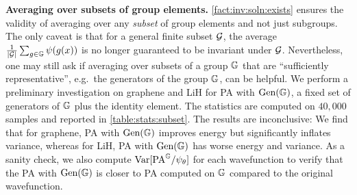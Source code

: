 \vspace{.5em}



\textbf{Averaging over subsets of group elements.} \cref{fact:inv:soln:exists} ensures the validity of averaging over any \emph{subset} of group elements and not just subgroups. The only caveat is that for a general finite subset $\mathcal{G}$, the average $\frac{1}{|\mathcal{G}|} \sum_{g \in \mathbb{G}} \psi(g(x))$ is no longer guaranteed to be invariant under $\mathcal{G}$. Nevertheless, one may still ask if averaging over subsets of a group $\mathbb{G}$ that are ``sufficiently representative'', e.g.~the generators of the group $\mathbb{G}$, can be helpful. We perform a preliminary investigation on graphene and LiH for PA with $\textrm{Gen}(\mathbb{G})$, a fixed set of generators of $\mathbb{G}$ plus the identity element. The statistics are computed on $40,000$ samples and reported in \cref{table:stats:subset}. The results are inconclusive: We find that for graphene, PA with $\textrm{Gen}(\mathbb{G})$ improves energy but significantly inflates variance, whereas for LiH, PA with $\textrm{Gen}(\mathbb{G})$ has worse energy and variance. As a sanity check, we also compute $\text{\rm Var}[ {\rm PA}^{\mathbb{G}} / \psi_\theta ]$ for each wavefunction to verify that the PA with $\textrm{Gen}(\mathbb{G})$ is closer to PA computed on $\mathbb{G}$ compared to the original wavefunction. 

\vspace{.5em}

